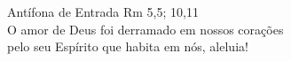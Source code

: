 \vspace{.5cm}
\textcolor{VioletRed1}{Antífona de Entrada}
\hspace{\fill}
\textcolor{VioletRed1}{Rm 5,5; 10,11}
\vspace{.2cm} \\
O amor de Deus foi derramado em nossos corações \\ pelo seu Espírito que habita em nós, aleluia!
\vspace{.2cm} \\
